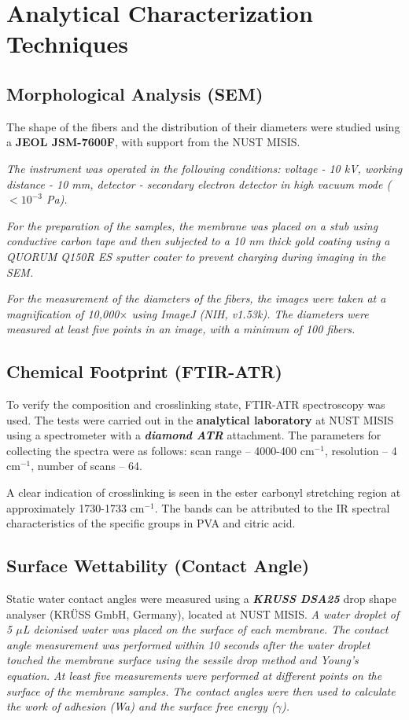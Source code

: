 \documentclass[12pt,a4paper]{report}
\begin{document}
\section{Analytical Characterization Techniques}
\subsection{Morphological Analysis (SEM)}
The shape of the fibers and the distribution of their diameters were studied using a \textbf{JEOL JSM-7600F}, with support from the NUST MISIS.

\textit{The instrument was operated in the following conditions: voltage - 10 kV, working distance - 10 mm, detector - secondary electron detector in high vacuum mode (\(<10^{-3}\) Pa).}

\textit{For the preparation of the samples, the membrane was placed on a stub using conductive carbon tape and then subjected to a 10 nm thick gold coating using a QUORUM Q150R ES sputter coater to prevent charging during imaging in the SEM.\cite{39}}

\textit{For the measurement of the diameters of the fibers, the images were taken at a magnification of 10,000\(\times\) using ImageJ (NIH, v1.53k). The diameters were measured at least five points in an image, with a minimum of 100 fibers.}

\subsection{Chemical Footprint (FTIR-ATR)}
To verify the composition and crosslinking state, FTIR-ATR spectroscopy was used. The tests were carried out in the\textbf{ analytical laboratory} at NUST MISIS using a spectrometer with a \textit{\textbf{diamond ATR}} attachment. The parameters for collecting the spectra were as follows: scan range – 4000-400 cm\(^{-1}\), resolution – 4 cm\(^{-1}\), number of scans – 64.

A clear indication of crosslinking is seen in the ester carbonyl stretching region at approximately 1730-1733 cm\(^{-1}\). \cite{36,51} The bands can be attributed to the IR spectral characteristics of the specific groups in PVA and citric acid. \cite{69,70}

\subsection{Surface Wettability (Contact Angle)}
Static water contact angles were measured using a \textbf{\textit{KRUSS DSA25}} drop shape analyser (KRÜSS GmbH, Germany), located at NUST MISIS. \textit{A water droplet of 5 \(\mu\)L deionised water was placed on the surface of each membrane. The contact angle measurement was performed within 10 seconds after the water droplet touched the membrane surface using the sessile drop method and Young’s equation.\cite{71} At least five measurements were performed at different points on the surface of the membrane samples. The contact angles were then used to calculate the work of adhesion (Wa) and the surface free energy (\(\gamma\)).}
\end{document}
